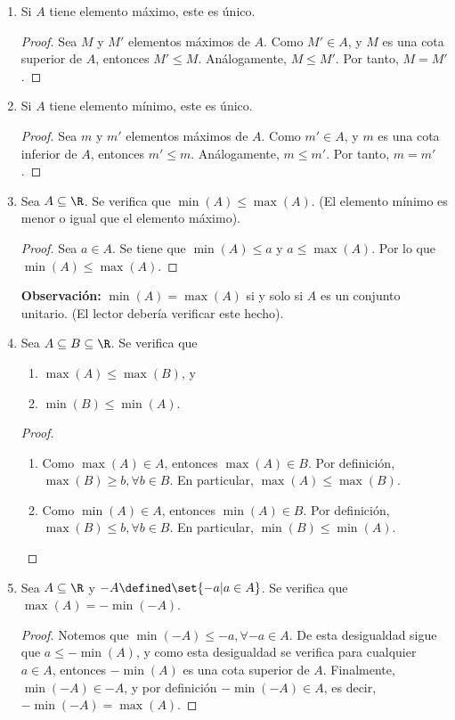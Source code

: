 \begin{enumerate}[label=\alph*)]
  \item Si $A$ tiene elemento máximo, este es único.
  
  \begin{proof}\leavevmode
    Sea $M$ y $M'$ elementos máximos de $A$. Como $M'\in A$, y $M$ es una cota superior de $A$, entonces $M'\leq M$. Análogamente, $M\leq M'$. Por tanto, $M=M'$.
  \end{proof}
  
  \item Si $A$ tiene elemento mínimo, este es único.
  \begin{proof}\leavevmode
    Sea $m$ y $m'$ elementos máximos de $A$. Como $m'\in A$, y $m$ es una cota inferior de $A$, entonces $m'\leq m$. Análogamente, $m\leq m'$. Por tanto, $m=m'$.
  \end{proof}
  
  \item Sea $A\subseteq \R$. Se verifica que $\min(A)\leq \max(A)$.
  (El elemento mínimo es menor o igual que el elemento máximo).
  \begin{proof}\leavevmode
    Sea $a\in A$. Se tiene que $\min(A)\leq a$ y $a\leq \max(A)$. Por lo que $\min(A)\leq \max(A)$.
  \end{proof}
  
  \textbf{Observación:} $\min(A)=\max(A)$ si y solo si $A$ es un conjunto unitario. (El lector debería verificar este hecho).
  
  \item Sea $A\subseteq B \subseteq \R$. Se verifica que
  \begin{enumerate}[label=\roman*)]
    \item $\max(A) \leq \max(B)$, y
    \item $\min(B)\leq \min(A)$.
  \end{enumerate}
  \begin{proof}\leavevmode
    \begin{enumerate}[label=\roman*)]
      \item Como $\max(A) \in A$, entonces $\max(A)\in B$. Por definición, $\max(B)\geq b, \forall b\in B$. En particular, $\max(A)\leq \max(B)$.
      \item Como $\min(A)\in A$, entonces $\min(A)\in B$. Por definición, $\max(B)\leq b,\forall b\in B$. En particular, $\min(B)\leq \min(A)$. \qedhere
    \end{enumerate}
  \end{proof}
  
  \item Sea $A\subseteq \R$ y $-A\defined \set{-a| a\in A}$. Se verifica que $\max(A)=-\min(-A)$.
  \begin{proof}\leavevmode
    Notemos que $\min(-A)\leq -a, \forall -a\in A$. De esta desigualdad sigue que $a\leq -\min(A)$, y como esta desigualdad se verifica para cualquier $a\in A$, entonces $-\min(A)$ es una cota superior de $A$. Finalmente, $\min(-A)\in -A$, y por definición $-\min(-A)\in A$, es decir, $-\min(-A)=\max(A)$.
  \end{proof}
  

\end{enumerate}
